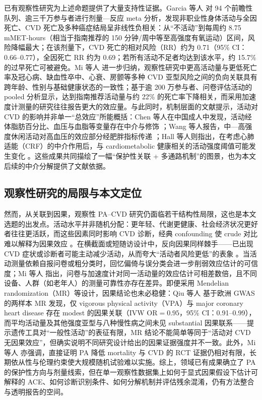 \documentclass[12pt,a4paper]{article}
\begin{document}
已有观察性研究为上述命题提供了大量支持性证据。Garcia 等人 \cite{garcia2023meta} 对 94 个前瞻性队列、逾三千万参与者进行剂量—反应 meta 分析，发现非职业性身体活动与全因死亡、CVD 死亡及多种癌症结局呈非线性负相关：从“不活动”到每周约 8.75 mMET-hours（相当于指南推荐的 150 分钟/周中等至高强度有氧运动）区间，风险降幅最大；在该剂量下，CVD 死亡的相对风险（RR）约为 0.71（95\% CI：0.66–0.77），全因死亡 RR 约为 0.69；若所有活动不足者均达到该水平，约 15.7\% 的过早死亡可被避免。Mi 等人 \cite{mi2025creview} 进一步归纳，观察性研究中更高活动量与更低死亡率及冠心病、缺血性卒中、心衰、房颤等多种 CVD 亚型风险之间的负向关联具有跨年龄、性别与基础健康状态的一致性；基于逾 200 万参与者、问卷评估活动的 pooled 分析显示，达到指南推荐活动量与约 22\% 的死亡率下降相关，而采用加速度计测量的研究往往报告更大的效应量。与此同时，机制层面的文献提示，活动对 CVD 的影响并非单一“总效应”所能概括：Chen 等人在中国成人中发现，活动经体脂肪百分比、血压与血脂等变量存在中介与修饰 \cite{chen2023pa}；Wang 等人报告，中—高强度休闲活动对高血压的效应部分经肥胖指标传递 \cite{wang2023obesity}；Hall 等人则指出，在考虑心肺适能（CRF）的中介作用后，与 cardiometabolic 健康相关的活动强度阈值可能发生变化 \cite{bjsports2023crf}。这些成果共同描绘了一幅“保护性关联 + 多通路机制”的图景，也为本文后续的中介分解提供了文献依据。

\subsection{观察性研究的局限与本文定位}

然而，从关联到因果，观察性 PA–CVD 研究仍面临若干结构性局限，这也是本文选题的出发点。活动水平并非随机分配：更年轻、代谢更健康、社会经济状况更好者往往更活跃，而这些因素同时影响 CVD 诊断，经典 confounding 使 crude 对比难以解释为因果效应 \cite{mi2025creview,hernan2024whatif}。在横截面或短随访设计中，反向因果同样棘手——已出现 CVD 症状或诊断者可能主动减少活动，从而夸大“活动者风险更低”的表象 \cite{mi2025creview}。当活动测量依赖自报问卷或粗分类时，回忆偏倚与误分类会进一步削弱效应估计的可信度；Mi 等人 \cite{mi2025creview} 指出，问卷与加速度计对同一活动量的效应估计可相差数倍，且不同设备、人群（如老年人）的测量可靠性亦存在差异。即便采用 Mendelian randomization（MR）等设计，因果结论也未必稳健：Qiu 等人 \cite{qiu2025mr} 基于欧洲 GWAS 的两样本 MR 发现，仅 vigorous physical activity（VPA）与 major coronary heart disease 存在 modest 的因果关联（IVW OR$=0.95$，95\% CI：0.91–0.99），而平均活动量及其他强度亚型与八种慢性病之间未见 substantial 因果联系——提示遗传工具对“一般性活动”的表征有限，MR 结论不能简单等同于“活动对 CVD 无因果效应”，但确实说明不同研究设计给出的因果证据强度并不一致。此外，Mi 等人 \cite{mi2025creview} 亦强调，直接证明 PA 降低 mortality 与 CVD 的 RCT 证据仍相对有限，长期依从性与伦理约束使大规模随机试验难以实施。综上，领域已有成果确立了 PA 的保护性方向与剂量线索，但在单一观察性数据集上如何于显式因果假设下估计可解释的 ACE、如何诊断识别条件、如何分解机制并评估残余混淆，仍有方法整合与透明报告的空间。
\end{document}
